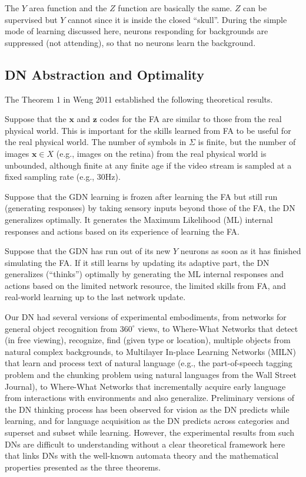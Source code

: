 \documentclass[conference]{IEEEtran}
\def\x{\mathbf x}
\def\z{\mathbf z}
\begin{document}
The $Y$ area function and the $Z$ function are basically the same.   $Z$ can be supervised but 
$Y$ cannot since it is inside the closed ``skull''.   
During the simple mode of learning discussed here, neurons responding for
backgrounds are suppressed (not attending), so that no neurons learn the background.   

\subsection{DN Abstraction and Optimality}
\label{SE:motivation}

The Theorem 1 in Weng 2011 \cite{WengIJCNN11,Weng3ThmRpt11} established the following
theoretical results.  

Suppose that the $\x$ and $\z$ codes for the FA are similar to those from the real physical world. 
This is important for the skills learned from FA to be useful for the real physical world.
The number of symbols in $\Sigma$ is finite, but the number of images $\x \in X$ (e.g., images on the retina) from the real 
physical world is unbounded, although finite at any finite age if the video stream is sampled at a fixed sampling rate (e.g., 
30Hz).
 
Suppose that the GDN learning is frozen after learning the FA 
but still run (generating responses) by taking sensory inputs beyond those of the FA,  
the DN generalizes optimally.  It generates the Maximum Likelihood (ML) internal responses and 
actions based on its experience of learning the FA.

Suppose that the GDN has run out of its new $Y$ neurons as soon as it has finished
simulating the FA.     
If it still learns by updating its adaptive part, the 
DN generalizes (``thinks'') optimally by generating the ML internal responses and actions 
based on the limited network resource, the limited skills from FA, and
real-world learning up to the last network update. 

Our DN had several versions of experimental 
embodiments, from networks for general object recognition from $360^\circ$ views,
to Where-What Networks that detect (in free viewing), recognize, find (given type or location), multiple objects from natural complex backgrounds, to Multilayer In-place Learning Networks (MILN) that learn and process text of natural language (e.g., the part-of-speech tagging problem and the 
chunking problem using natural languages from the Wall Street Journal), to Where-What Networks that 
incrementally acquire early language from interactions with environments and also generalize. 
Preliminary versions of the DN thinking process has been observed for vision 
as the DN predicts while learning, and for language acquisition as the DN predicts across
categories and superset and subset while learning.   
However, the experimental results from such DNs are difficult to understanding without a clear 
theoretical framework here that links DNs with the well-known automata theory and the mathematical 
properties presented as the three theorems.   
\end{document}
